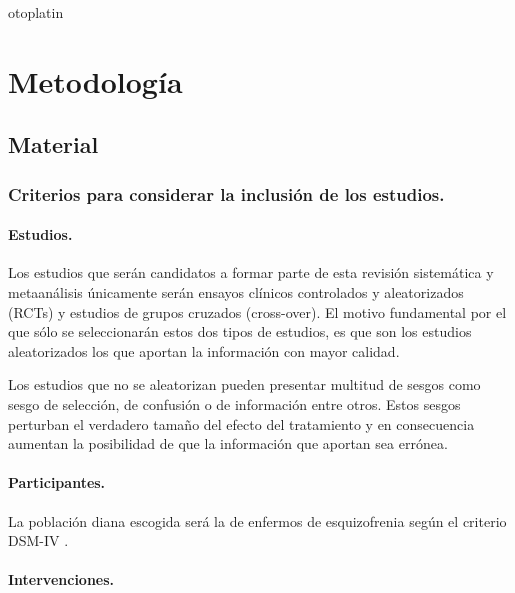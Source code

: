 otoplatin\documentclass[a4paper,openright,12pt]{report}
\begin{document}
\chapter{Metodología}\label{cap.metodología}
\section{Material}
\subsection{Criterios para considerar la inclusión de los estudios.}
\subsubsection{Estudios.}

Los estudios que serán candidatos a formar parte de esta revisión sistemática y metaanálisis únicamente serán ensayos clínicos controlados y aleatorizados (RCTs) y estudios de grupos cruzados (cross-over). El motivo fundamental por el que sólo se seleccionarán estos dos tipos de estudios, es que son los estudios aleatorizados los que aportan la información con mayor calidad.

Los estudios que no se aleatorizan pueden presentar multitud de sesgos como sesgo de selección, de confusión o de información entre otros. Estos sesgos perturban el verdadero tamaño del efecto del tratamiento y en consecuencia aumentan la posibilidad de que la información que aportan sea errónea. 

\subsubsection{Participantes.}

La población diana escogida será la de enfermos de esquizofrenia según el criterio DSM-IV \cite{DSMIV1994}.

\subsubsection{Intervenciones.}
\end{document}
